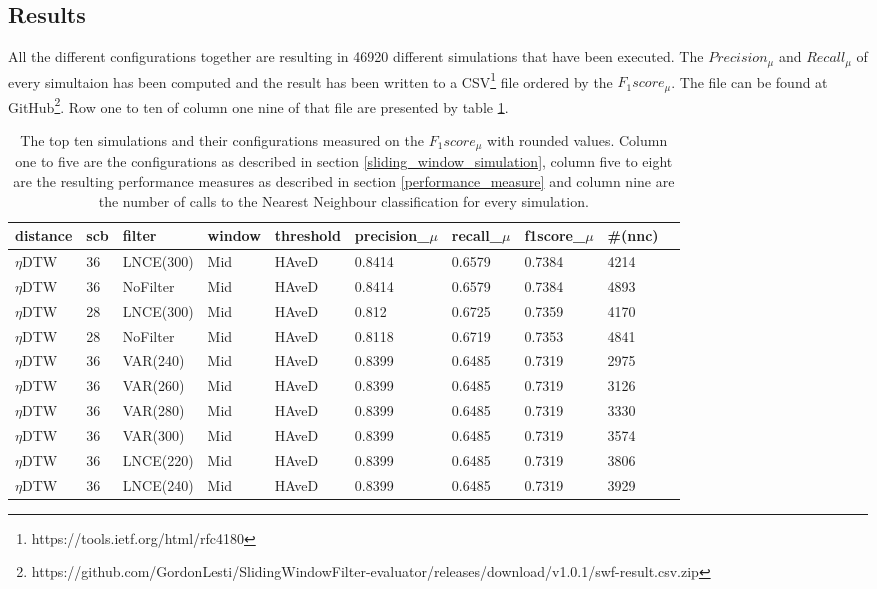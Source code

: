 \subsection{Results} \label{results}
All the different configurations together are resulting in 46920 different simulations that have been executed. The
$Precision_{\mu}$ and $Recall_{\mu}$ of every simultaion has been computed and the result has been written to a
CSV\footnote{https://tools.ietf.org/html/rfc4180} file ordered by the $F_{1}score_{\mu}$. The file can be found at
GitHub\footnote{https://github.com/GordonLesti/SlidingWindowFilter-evaluator/releases/download/v1.0.1/swf-result.csv.zip}.
Row one to ten of column one nine of that file are presented by table \ref{tab:result}.

\begin{table}[H]
    \begin{center}
        {\scriptsize
            \begin{tabular}{l l l l l l l l l l}
                \textbf{distance} & \textbf{scb} & \textbf{filter} & \textbf{window} & \textbf{threshold} & \textbf{precision\_$\mu$} & \textbf{recall\_$\mu$} & \textbf{f1score\_$\mu$} & \textbf{\#(nnc)}\\
                \hline
                $\eta$DTW & 36 & LNCE(300) & Mid  & HAveD & 0.8414 & 0.6579 & 0.7384 & 4214\\
                $\eta$DTW & 36 & NoFilter & Mid  & HAveD & 0.8414 & 0.6579 & 0.7384 & 4893\\
                $\eta$DTW & 28 & LNCE(300) & Mid  & HAveD & 0.812 & 0.6725 & 0.7359 & 4170\\
                $\eta$DTW & 28 & NoFilter & Mid  & HAveD & 0.8118 & 0.6719 & 0.7353 & 4841\\
                $\eta$DTW & 36 & VAR(240) & Mid  & HAveD & 0.8399 & 0.6485 & 0.7319 & 2975\\
                $\eta$DTW & 36 & VAR(260) & Mid & HAveD & 0.8399 & 0.6485 & 0.7319 & 3126\\
                $\eta$DTW & 36 & VAR(280) & Mid & HAveD & 0.8399 & 0.6485 & 0.7319 & 3330\\
                $\eta$DTW & 36 & VAR(300) & Mid & HAveD & 0.8399 & 0.6485 & 0.7319 & 3574\\
                $\eta$DTW & 36 & LNCE(220) & Mid & HAveD & 0.8399 & 0.6485 & 0.7319 & 3806\\
                $\eta$DTW & 36 & LNCE(240) & Mid & HAveD & 0.8399 & 0.6485 & 0.7319 & 3929\\
            \end{tabular}
        }
    \end{center}
    \caption{The top ten simulations and their configurations measured on the $F_{1}score_{\mu}$ with rounded values.
    Column one to five are the configurations as described in section \ref{sliding_window_simulation}, column five to
    eight are the resulting performance measures as described in section \ref{performance_measure} and column nine are
    the number of calls to the Nearest Neighbour classification for every simulation.}
	\label{tab:result}
\end{table}

